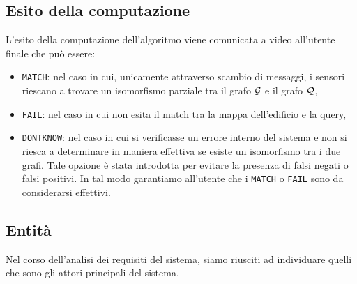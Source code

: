 \documentclass{llncs}
\begin{document}
\subsection{Esito della computazione}
L'esito della computazione dell'algoritmo viene comunicata a video all'utente finale che può essere:
\begin{itemize}
\item \texttt{MATCH}: nel caso in cui, unicamente attraverso scambio di messaggi, i sensori riescano a trovare
  un isomorfismo parziale tra il grafo $\mathcal{G}$ e il grafo $\mathcal{Q}$,
\item \texttt{FAIL}: nel caso in cui non esita il match tra la mappa dell'edificio e la query,
\item \texttt{DONTKNOW}: nel caso in cui si verificasse un errore interno del sistema e 
  non si riesca a determinare in maniera effettiva se esiste un isomorfismo tra i due grafi. Tale opzione 
  è stata introdotta per evitare la presenza di falsi negati o falsi positivi. In tal modo garantiamo all'utente 
  che i  \texttt{MATCH} o \texttt{FAIL} sono da considerarsi effettivi.
\end{itemize}

\subsection{Entità}
Nel corso dell'analisi dei requisiti del sistema, siamo riusciti ad individuare quelli che sono 
gli attori principali del sistema.
\end{document}
